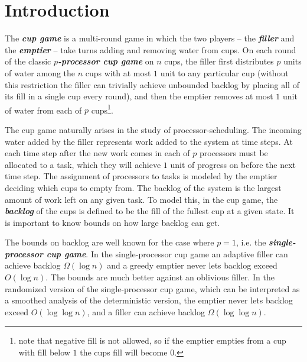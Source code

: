 \documentclass[twocolumn]{article}[10pt]
\newcommand{\defn}[1]{{\textit{\textbf{\boldmath #1}}}\xspace}
\renewcommand{\paragraph}[1]{\vspace{0.09in}\noindent{\bf \boldmath #1.}}
\begin{document}
\section{Introduction}\label{sec:intro}
\paragraph{Definition and Motivation}
The \defn{cup game} is a multi-round game in which the two players -- the
\defn{filler} and the \defn{emptier} -- take turns adding and removing water
from cups. On each round of the classic \defn{$p$-processor cup game} on $n$
cups, the filler first distributes $p$ units of water among
the $n$ cups with at most $1$ unit to any particular cup (without this
restriction the filler can trivially achieve unbounded backlog by placing all
of its fill in a single cup every round), and then the emptier 
removes at most $1$ unit of water from each of $p$ cups\footnote{note that negative
fill is not allowed, so if the emptier empties from a cup with fill below $1$
the cups fill will become $0$.}.

The cup game naturally arises in the study of processor-scheduling.
The incoming water added by the filler represents work added to the system at
time steps. At each time step after the new work comes in each of $p$
processors must be allocated to a task, which they will achieve $1$ unit of
progress on before the next time step. The assignment of processors to tasks is
modeled by the emptier deciding which cups to empty from. The backlog of
the system is the largest amount of work left on any given task. To model this,
in the cup game, the \defn{backlog} of the cups is defined to be the fill of
the fullest cup at a given state. 
It is important to know bounds on how large backlog can get.

\paragraph{Previous Work}
The bounds on backlog are well known for the case where $p=1$, i.e. the
\defn{single-processor cup game}.
In the single-processor cup game an adaptive filler can achieve backlog
$\Omega(\log n)$ and a greedy emptier never lets backlog exceed $O(\log n)$.
The bounds are much better against an oblivious filler.
In the randomized version of the single-processor cup game, which can be
interpreted as a smoothed analysis of the deterministic version, the emptier
never lets backlog exceed $O(\log \log n)$, and a filler can achieve backlog
$\Omega(\log\log n)$.
\end{document}
